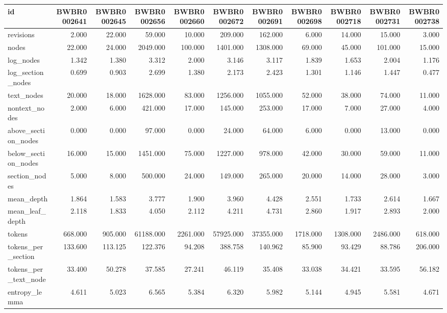 \begin{tabular}{lrrrrrrrrrr}
\toprule
id & BWBR0002641 & BWBR0002645 & BWBR0002656 & BWBR0002660 & BWBR0002672 & BWBR0002691 & BWBR0002698 & BWBR0002718 & BWBR0002731 & BWBR0002738 \\
\midrule
revisions & 2.000 & 22.000 & 59.000 & 10.000 & 209.000 & 162.000 & 6.000 & 14.000 & 15.000 & 3.000 \\
\cline{1-11}
nodes & 22.000 & 24.000 & 2049.000 & 100.000 & 1401.000 & 1308.000 & 69.000 & 45.000 & 101.000 & 15.000 \\
\cline{1-11}
log\_nodes & 1.342 & 1.380 & 3.312 & 2.000 & 3.146 & 3.117 & 1.839 & 1.653 & 2.004 & 1.176 \\
\cline{1-11}
log\_section\_nodes & 0.699 & 0.903 & 2.699 & 1.380 & 2.173 & 2.423 & 1.301 & 1.146 & 1.447 & 0.477 \\
\cline{1-11}
text\_nodes & 20.000 & 18.000 & 1628.000 & 83.000 & 1256.000 & 1055.000 & 52.000 & 38.000 & 74.000 & 11.000 \\
\cline{1-11}
nontext\_nodes & 2.000 & 6.000 & 421.000 & 17.000 & 145.000 & 253.000 & 17.000 & 7.000 & 27.000 & 4.000 \\
\cline{1-11}
above\_section\_nodes & 0.000 & 0.000 & 97.000 & 0.000 & 24.000 & 64.000 & 6.000 & 0.000 & 13.000 & 0.000 \\
\cline{1-11}
below\_section\_nodes & 16.000 & 15.000 & 1451.000 & 75.000 & 1227.000 & 978.000 & 42.000 & 30.000 & 59.000 & 11.000 \\
\cline{1-11}
section\_nodes & 5.000 & 8.000 & 500.000 & 24.000 & 149.000 & 265.000 & 20.000 & 14.000 & 28.000 & 3.000 \\
\cline{1-11}
mean\_depth & 1.864 & 1.583 & 3.777 & 1.900 & 3.960 & 4.428 & 2.551 & 1.733 & 2.614 & 1.667 \\
\cline{1-11}
mean\_leaf\_depth & 2.118 & 1.833 & 4.050 & 2.112 & 4.211 & 4.731 & 2.860 & 1.917 & 2.893 & 2.000 \\
\cline{1-11}
tokens & 668.000 & 905.000 & 61188.000 & 2261.000 & 57925.000 & 37355.000 & 1718.000 & 1308.000 & 2486.000 & 618.000 \\
\cline{1-11}
tokens\_per\_section & 133.600 & 113.125 & 122.376 & 94.208 & 388.758 & 140.962 & 85.900 & 93.429 & 88.786 & 206.000 \\
\cline{1-11}
tokens\_per\_text\_node & 33.400 & 50.278 & 37.585 & 27.241 & 46.119 & 35.408 & 33.038 & 34.421 & 33.595 & 56.182 \\
\cline{1-11}
entropy\_lemma & 4.611 & 5.023 & 6.565 & 5.384 & 6.320 & 5.982 & 5.144 & 4.945 & 5.581 & 4.671 \\

\end{tabular}
